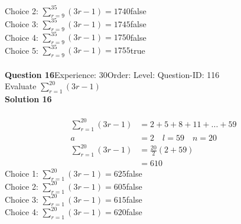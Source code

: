 \documentclass{article}
\begin{document}
Choice 2: \hspace{20pt}$\displaystyle\sum_{r=9}^{35} (3r-1)=1740$\hspace{20pt}false\\
Choice 3: \hspace{20pt}$\displaystyle\sum_{r=9}^{35} (3r-1)=1745$\hspace{20pt}false\\
Choice 4: \hspace{20pt}$\displaystyle\sum_{r=9}^{35} (3r-1)=1750$\hspace{20pt}false\\
Choice 5: \hspace{20pt}$\displaystyle\sum_{r=9}^{35} (3r-1)=1755$\hspace{20pt}true\\
\\[4pt]
\noindent\textbf{Question 16}\hspace{20pt}Experience: 30\hspace{20pt}Order: \hspace{20pt}Level: \hspace{20pt}Question-ID: 116\\[2pt]
Evaluate $\displaystyle\sum_{r=1}^{20} (3r-1)$\\[4pt]
\noindent\textbf{Solution 16}\\[2pt]
\\[-35pt]\begin{align*}
\displaystyle\sum_{r=1}^{20} (3r-1)&=2+5+8+11+...+59\\[2pt]
a&=2\quad l=59 \quad n=20\\[2pt]
\displaystyle\sum_{r=1}^{20} (3r-1)&=\displaystyle\frac{20}{2}(2+59)\\[2pt]
&=610
\end{align*}
Choice 1: \hspace{20pt}$\displaystyle\sum_{r=1}^{20} (3r-1)=625$\hspace{20pt}false\\
Choice 2: \hspace{20pt}$\displaystyle\sum_{r=1}^{20} (3r-1)=605$\hspace{20pt}false\\
Choice 3: \hspace{20pt}$\displaystyle\sum_{r=1}^{20} (3r-1)=615$\hspace{20pt}false\\
Choice 4: \hspace{20pt}$\displaystyle\sum_{r=1}^{20} (3r-1)=620$\hspace{20pt}false\\
\end{document}
